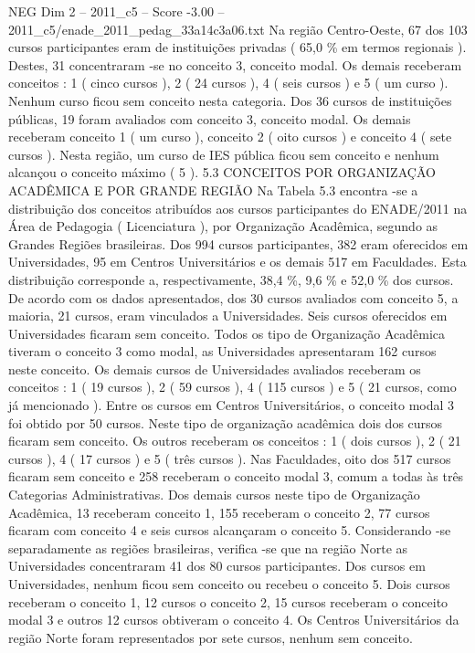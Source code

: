 \begin{textsample}{NEG Dim 2 – 2011\_c5 – Score -3.00 – 2011\_c5/enade\_2011\_pedag\_33a14c3a06.txt}
Na região Centro-Oeste, 67 dos 103 cursos participantes eram de instituições privadas ( 65,0 \% em termos regionais ).
Destes, 31 concentraram -se no conceito 3, conceito modal.
Os demais receberam conceitos : 1 ( cinco cursos ), 2 ( 24 cursos ), 4 ( seis cursos ) e 5 ( um curso ).
Nenhum curso ficou sem conceito nesta categoria.
Dos 36 cursos de instituições públicas, 19 foram avaliados com conceito 3, conceito modal.
Os demais receberam conceito 1 ( um curso ), conceito 2 ( oito cursos ) e conceito 4 ( sete cursos ).
Nesta região, um curso de IES pública ficou sem conceito e nenhum alcançou o conceito máximo ( 5 ). 5.3 CONCEITOS POR ORGANIZAÇÃO ACADÊMICA E POR GRANDE REGIÃO Na Tabela 5.3 encontra -se a distribuição dos conceitos atribuídos aos cursos participantes do ENADE/2011 na Área de Pedagogia ( Licenciatura ), por Organização Acadêmica, segundo as Grandes Regiões brasileiras.
Dos 994 cursos participantes, 382 eram oferecidos em Universidades, 95 em Centros Universitários e os demais 517 em Faculdades.
Esta distribuição corresponde a, respectivamente, 38,4 \%, 9,6 \% e 52,0 \% dos cursos.
De acordo com os dados apresentados, dos 30 cursos avaliados com conceito 5, a maioria, 21 cursos, eram vinculados a Universidades.
Seis cursos oferecidos em Universidades ficaram sem conceito.
Todos os tipo de Organização Acadêmica tiveram o conceito 3 como modal, as Universidades apresentaram 162 cursos neste conceito.
Os demais cursos de Universidades avaliados receberam os conceitos : 1 ( 19 cursos ), 2 ( 59 cursos ), 4 ( 115 cursos ) e 5 ( 21 cursos, como já mencionado ).
Entre os cursos em Centros Universitários, o conceito modal 3 foi obtido por 50 cursos.
Neste tipo de organização acadêmica dois dos cursos ficaram sem conceito.
Os outros receberam os conceitos : 1 ( dois cursos ), 2 ( 21 cursos ), 4 ( 17 cursos ) e 5 ( três cursos ).
Nas Faculdades, oito dos 517 cursos ficaram sem conceito e 258 receberam o conceito modal 3, comum a todas às três Categorias Administrativas.
Dos demais cursos neste tipo de Organização Acadêmica, 13 receberam conceito 1, 155 receberam o conceito 2, 77 cursos ficaram com conceito 4 e seis cursos alcançaram o conceito 5.
Considerando -se separadamente as regiões brasileiras, verifica -se que na região Norte as Universidades concentraram 41 dos 80 cursos participantes.
Dos cursos em Universidades, nenhum ficou sem conceito ou recebeu o conceito 5.
Dois cursos receberam o conceito 1, 12 cursos o conceito 2, 15 cursos receberam o conceito modal 3 e outros 12 cursos obtiveram o conceito 4.
Os Centros Universitários da região Norte foram representados por sete cursos, nenhum sem conceito.

\end{textsample}
